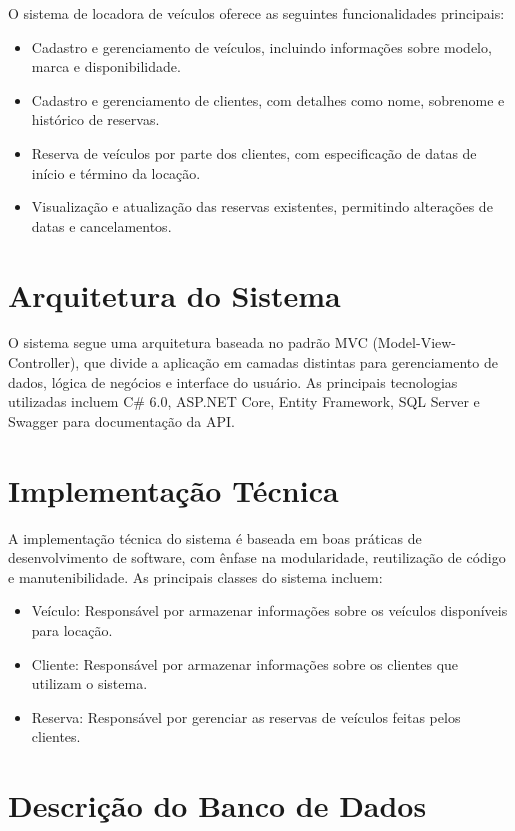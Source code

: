 \documentclass[12pt]{article}
\begin{document}
O sistema de locadora de veículos oferece as seguintes funcionalidades principais:
\begin{itemize}
    \item Cadastro e gerenciamento de veículos, incluindo informações sobre modelo, marca e disponibilidade.
    \item Cadastro e gerenciamento de clientes, com detalhes como nome, sobrenome e histórico de reservas.
    \item Reserva de veículos por parte dos clientes, com especificação de datas de início e término da locação.
    \item Visualização e atualização das reservas existentes, permitindo alterações de datas e cancelamentos.
\end{itemize}

\section{Arquitetura do Sistema}

O sistema segue uma arquitetura baseada no padrão MVC (Model-View-Controller), que divide a aplicação em camadas distintas para gerenciamento de dados, lógica de negócios e interface do usuário. As principais tecnologias utilizadas incluem C\# 6.0, ASP.NET Core, Entity Framework, SQL Server e Swagger para documentação da API.

\section{Implementação Técnica}

A implementação técnica do sistema é baseada em boas práticas de desenvolvimento de software, com ênfase na modularidade, reutilização de código e manutenibilidade. As principais classes do sistema incluem:
\begin{itemize}
    \item Veículo: Responsável por armazenar informações sobre os veículos disponíveis para locação.
    \item Cliente: Responsável por armazenar informações sobre os clientes que utilizam o sistema.
    \item Reserva: Responsável por gerenciar as reservas de veículos feitas pelos clientes.
\end{itemize}

\section{Descrição do Banco de Dados}
\end{document}
